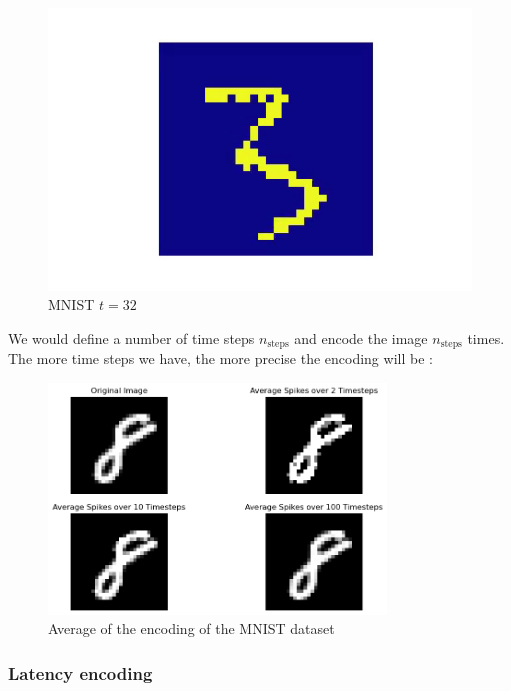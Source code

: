 \documentclass[11pt]{article}
\begin{document}
\begin{figure}[H]
\begin{minipage}{0.3\textwidth}
    \includegraphics[width=1\textwidth]{image/rate_gif-32.png}
    \caption{MNIST\cite{eshraghian2021training} $t=32$}
    \label{fig:rate_t_32}
  \end{minipage}
\end{figure}

We would define a number of time steps $n_{\text{steps}}$ and encode the image $n_{\text{steps}}$ times. The more time steps we have, the more precise the encoding will be :

\begin{figure}[H]
  \begin{center}
    \includegraphics[width=0.8\textwidth]{./image/avg_mnist_spike.png}
    \caption{Average of the encoding of the MNIST dataset}
    \label{fig:avg_mnist_spike}
  \end{center}
\end{figure}

\subsubsection{Latency encoding}
\end{document}
